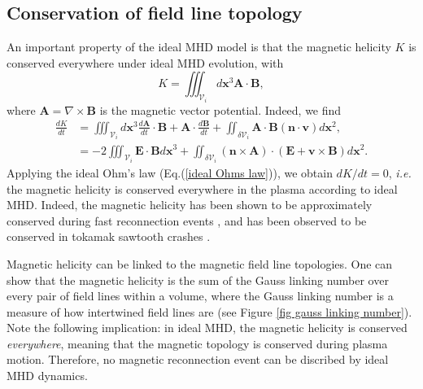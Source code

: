 \documentclass[my_thesis.tex]{subfiles}
\begin{document}
\subsection{Conservation of field line topology}
An important property of the ideal MHD model is that the magnetic helicity $K$ is conserved everywhere under ideal MHD evolution, with
\begin{equation}
	K = \iiint_{\mathcal{V}_i} d\mathbf{x}^3 \mathbf{A} \cdot \mathbf{B},
\end{equation}
where $\mathbf{A}=\nabla\times\mathbf{B}$ is the magnetic vector potential. Indeed, we find
\begin{align}
	\frac{dK}{dt} &= \iiint_{\mathcal{V}_i} d\mathbf{x}^3 \frac{d\mathbf{A}}{dt}\cdot\mathbf{B} + \mathbf{A}\cdot\frac{d\mathbf{B}}{dt} + \iint_{\delta\mathcal{V}_i} \mathbf{A}\cdot\mathbf{B}(\mathbf{n}\cdot\mathbf{v})d\mathbf{x}^2, \\
	&= -2\iiint_{\mathcal{V}_i}\mathbf{E}\cdot\mathbf{B} d\mathbf{x}^3 + \iint_{\delta\mathcal{V}_i}(\mathbf{n}\times\mathbf{A})\cdot(\mathbf{E}+\mathbf{v}\times\mathbf{B})d\mathbf{x}^2.
\end{align}
Applying the ideal Ohm's law (Eq.(\ref{ideal Ohms law})), we obtain $dK/dt = 0$, \textit{i.e.} the magnetic helicity is conserved everywhere in the plasma according to ideal MHD. Indeed, the magnetic helicity has been shown to be approximately conserved during fast reconnection events \citep{bergerIntroductionMagneticHelicity1999}, and has been observed to be conserved in tokamak sawtooth crashes \citep{Heidbrink2000}. 

Magnetic helicity can be linked to the magnetic field line topologies. One can show \citep{moffattDegreeKnottednessTangled1969, arnoldTopologicalPropertiesMagnetic1998, bergerIntroductionMagneticHelicity1999} that the magnetic helicity is the sum of the Gauss linking number over every pair of field lines within a volume, where the Gauss linking number is a measure of how intertwined field lines are (see Figure \ref{fig gauss linking number}). Note the following implication: in ideal MHD, the magnetic helicity is conserved \emph{everywhere}, meaning that the magnetic topology is conserved during plasma motion. Therefore, no magnetic reconnection event can be discribed by ideal MHD dynamics.
\end{document}
